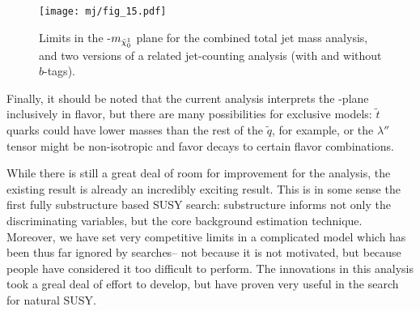 
\begin{figure}
\centering
\texttt{[image: mj/fig\_15.pdf]}
\label{fig:search:limits:compare}
\caption{Limits in the \mgluino-$m_{\tilde{\chi}_0^1}$ plane for the combined total jet mass analysis, and two versions of a related jet-counting analysis (with and without $b$-tags).}
\end{figure}


Finally, it should be noted that the current analysis interprets the \gluino-\lsp plane inclusively in flavor, but there are many possibilities for exclusive models: $\tilde{t}$ quarks could have lower masses than the rest of the $\tilde{q}$, for example, or the $\lambda''$ tensor might be non-isotropic and favor decays to certain flavor combinations.

While there is still a great deal of room for improvement for the analysis, the existing result is already an incredibly exciting result. This is in some sense the first fully substructure based SUSY search: substructure informs not only the discriminating variables, but the core background estimation technique. Moreover, we have set very competitive limits in a complicated model which has been thus far ignored by searches-- not because it is not motivated, but because people have considered it too difficult to perform. The innovations in this analysis took a greal deal of effort to develop, but have proven very useful in the search for natural SUSY.





